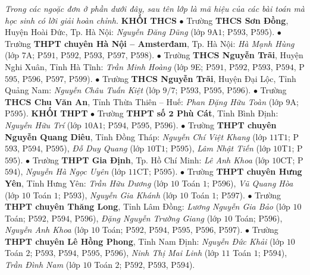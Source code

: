 \begin{multicols}{2}
	\textit{Trong các ngoặc đơn ở phần dưới đây, sau tên lớp là mã hiệu của các bài toán mà học sinh có lời giải hoàn chỉnh.}
	\vskip 0.05cm
	\textbf{\color{thachthuctoanhoc}KHỐI THCS}
	\vskip 0.05cm
	$\bullet$ Trường \textbf{\color{thachthuctoanhoc}THCS Sơn Đồng}, Huyện Hoài Đức, Tp. Hà Nội: \textit{Nguyễn Đăng Dũng} (lớp $9$A$1$; P$593$, P$595$).
	\vskip 0.05cm
	$\bullet$ Trường \textbf{\color{thachthuctoanhoc}THPT chuyên Hà Nội -- Amsterđam}, Tp. Hà Nội: \textit{Hà Mạnh Hùng} (lớp $7$A; P$591$, P$592$, P$593$, P$597$, P$598$).
	\vskip 0.05cm
	$\bullet$ Trường \textbf{\color{thachthuctoanhoc}THCS Nguyễn Trãi}, Huyện Nghi Xuân, Tỉnh Hà Tĩnh: \textit{Trần Minh Hoàng} (lớp $9$E; P$591$, P$592$, P$593$, P$594$, P$595$, P$596$, P$597$, P$599$).
	\vskip 0.05cm
	$\bullet$ Trường \textbf{\color{thachthuctoanhoc}THCS Nguyễn Trãi}, Huyện Đại Lộc, Tỉnh Quảng Nam: \textit{Nguyễn Châu Tuấn Kiệt} (lớp $9/7$; P$593$, P$595$, P$596$).
	\vskip 0.05cm
	$\bullet$ Trường \textbf{\color{thachthuctoanhoc}THCS Chu Văn An}, Tỉnh Thừa Thiên -- Huế: \textit{Phan Đặng Hữu Toàn} (lớp $9$A; P$595$).
	\vskip 0.05cm
	\textbf{\color{thachthuctoanhoc}KHỐI THPT}
	\vskip 0.05cm
	$\bullet$ Trường \textbf{\color{thachthuctoanhoc}THPT số $\pmb{2}$ Phù Cát}, Tỉnh Bình Định: \textit{Nguyễn Hữu Trí} (lớp $10$A$1$; P$594$, P$595$, P$596$).
	\vskip 0.05cm
	$\bullet$ Trường \textbf{\color{thachthuctoanhoc}THPT chuyên Nguyễn Quang Diêu}, Tỉnh Đồng Tháp: \textit{Nguyễn Chí Việt Khang} (lớp $11$T$1$; P$593$, P$594$, P$595$), \textit{Đỗ Duy Quang} (lớp $10$T$1$; P$595$), \textit{Lâm Nhật Tiến} (lớp $10$T$1$; P$595$).
	\vskip 0.05cm
	$\bullet$ Trường \textbf{\color{thachthuctoanhoc}THPT Gia Định}, Tp. Hồ Chí Minh: \textit{Lê Anh Khoa} (lớp $10$CT; P$594$), \textit{Nguyễn Hà Ngọc Uyên} (lớp $11$CT; P$595$).
	\vskip 0.05cm
	$\bullet$ Trường \textbf{\color{thachthuctoanhoc}THPT chuyên Hưng Yên}, Tỉnh Hưng Yên: \textit{Trần Hữu Dương} (lớp $10$ Toán $1$; P$596$), \textit{Vũ Quang Hòa} (lớp $10$ Toán $1$; P$593$), \textit{Nguyễn Gia Khánh} (lớp $10$ Toán $1$; P$597$).
	\vskip 0.05cm
	$\bullet$ Trường \textbf{\color{thachthuctoanhoc}THPT chuyên Thăng Long}, Tỉnh Lâm Đồng: \textit{Lương Nguyễn Gia Bảo} (lớp $10$ Toán; P$592$, P$594$, P$596$), \textit{Đặng Nguyễn Trường Giang} (lớp $10$ Toán; P$596$), \textit{Nguyễn Anh Khoa} (lớp $10$ Toán; P$592$, P$594$, P$595$, P$596$, P$597$).
	\vskip 0.05cm
	$\bullet$ Trường \textbf{\color{thachthuctoanhoc}THPT chuyên Lê Hồng Phong}, Tỉnh Nam Định: \textit{Nguyễn Đức Khải} (lớp $10$ Toán $2$; P$593$, P$594$, P$595$, P$596$), \textit{Ninh Thị Mai Linh} (lớp $11$ Toán $1$; P$594$), \textit{Trần Đình Nam} (lớp $10$ Toán $2$; P$592$, P$593$, P$594$).

\end{multicols}
